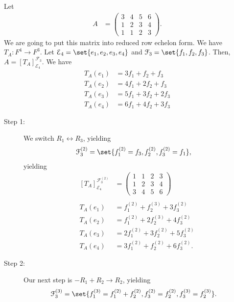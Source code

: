 \documentclass[10pt]{mypackage}
\begin{document}
\begin{example}
  Let
  \begin{align*}
    A &= \begin{pmatrix}3 & 4 & 5 & 6 \\ 1 & 2 & 3 & 4 \\ 1 & 1 & 2 & 3\end{pmatrix}.
  \end{align*}
  We are going to put this matrix into reduced row echelon form. We have $T_A: F^4 \rightarrow F^3$. Let $\mathcal{E}_4 = \set{e_1,e_2,e_3,e_4}$ and $\mathcal{F}_3 = \set{f_1,f_2,f_3}$. Then, $A = \left[T_A\right]_{\mathcal{E}_4}^{\mathcal{F}_3}$. We have
  \begin{align*}
    T_A\left(e_1\right) &= 3f_1 + f_2 + f_3\\
    T_A\left(e_2\right) &= 4f_1 + 2f_2 + f_3\\
    T_A\left(e_3\right) &= 5f_1 + 3f_2 + 2f_3\\
    T_A\left(e_4\right) &= 6f_1 + 4f_2 + 3f_3
  \end{align*}
  \begin{description}
    \item[Step 1:] We switch $R_1\leftrightarrow R_3$, yielding
      \begin{align*}
        \mathcal{F}_3^{(2)} &= \set{f_1^{(2)} = f_3,f_{2}^{(2)},f_{3}^{(2)} = f_1},
      \end{align*}
      yielding
      \begin{align*}
        \left[T_{A}\right]_{\mathcal{E}_4}^{\mathcal{F}_3^{(2)}} &= \begin{pmatrix}1 & 1 & 2 & 3 \\ 1 & 2 & 3 & 4 \\ 3 & 4 & 5 & 6\end{pmatrix}\\
        \\
        T_A\left(e_1\right) &= f_1^{(2)} + f_{2}^{(3)} + 3f_{3}^{(2)}\\
        T_A\left(e_2\right) &= f_{1}^{(2)} + 2f_{2}^{(3)} + 4f_3^{(2)}\\
        T_A\left(e_3\right) &= 2f_1^{(2)} + 3f_2^{(2)} + 5f_3^{(2)}\\
        T_A\left(e_4\right) &= 3f_1^{(2)} + f_2^{(2)} + 6f_3^{(2)}.
      \end{align*}
    \item[Step 2:] Our next step is $-R_1 + R_2 \rightarrow R_2$, yielding
      \begin{align*}
        \mathcal{F}_3^{(3)} &= \set{f_1^{(3)} = f_1^{(2)} + f_{2}^{(2)},f_{3}^{(2)} = f_{2}^{(2)},f_{3}^{(3)} = f_{2}^{(3)}}.

\end{align*}
\end{description}
\end{example}
\end{document}
